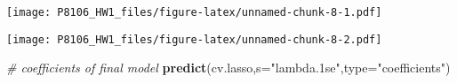 \documentclass[]{article}
\newenvironment{Shaded}{\begin{snugshade}}{\end{snugshade}}
\newcommand{\CommentTok}[1]{\textcolor[rgb]{0.56,0.35,0.01}{\textit{#1}}}
\newcommand{\DataTypeTok}[1]{\textcolor[rgb]{0.13,0.29,0.53}{#1}}
\newcommand{\KeywordTok}[1]{\textcolor[rgb]{0.13,0.29,0.53}{\textbf{#1}}}
\newcommand{\NormalTok}[1]{#1}
\newcommand{\OperatorTok}[1]{\textcolor[rgb]{0.81,0.36,0.00}{\textbf{#1}}}
\newcommand{\StringTok}[1]{\textcolor[rgb]{0.31,0.60,0.02}{#1}}
\begin{document}
\texttt{[image: P8106\_HW1\_files/figure-latex/unnamed-chunk-8-1.pdf]}

\begin{Shaded}
\end{Shaded}

\texttt{[image: P8106\_HW1\_files/figure-latex/unnamed-chunk-8-2.pdf]}

\begin{Shaded}
\begin{Highlighting}[]
\CommentTok{# coefficients of final model}
\KeywordTok{predict}\NormalTok{(cv.lasso,}\DataTypeTok{s=}\StringTok{"lambda.1se"}\NormalTok{,}\DataTypeTok{type=}\StringTok{"coefficients"}\NormalTok{)}
\end{Highlighting}
\end{Shaded}
\end{document}
